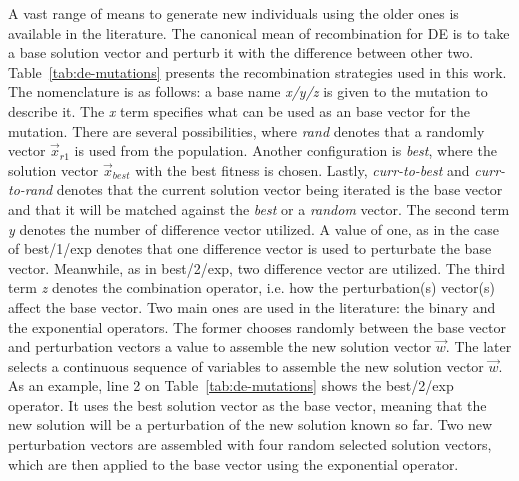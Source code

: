 A vast range of means to generate new individuals using the older ones is
available in the literature. The canonical mean of recombination for \ac{DE}
is to take a base solution vector and perturb it with the difference between
other two.
Table~\ref{tab:de-mutations} presents the recombination strategies used in this work.
The nomenclature is as follows: a base name \textit{x/y/z} is given to the
mutation to describe it. The \textit{x} term specifies what can be used
as an base vector for the mutation. There are several possibilities, where
\textit{rand} denotes that a randomly vector $\Vec{x}_{r1}$ is used from the population.
Another configuration is \textit{best}, where the solution vector $\Vec{x}_{best}$ 
with the best fitness is chosen. Lastly, \textit{curr-to-best} and \textit{curr-to-rand}
denotes that the current solution vector being iterated is the base vector and that
it will be matched against the \textit{best} or a \textit{random} vector.
The second term \textit{y} denotes the number of difference vector utilized.
A value of one, as in the case of best/1/exp denotes that one difference vector is
used to perturbate the base vector. Meanwhile, as in best/2/exp, two difference
vector are utilized. The third term \textit{z} denotes the combination operator,
i.e. how the perturbation(s) vector(s) affect the base vector. Two main ones
are used in the literature: the binary and the exponential operators.
The former chooses randomly between the base vector and perturbation vectors
a value to assemble the new solution vector $\Vec{w}$. The later selects
a continuous sequence of variables to assemble the new solution vector $\Vec{w}$.
As an example, line 2 on Table~\ref{tab:de-mutations} shows the best/2/exp operator.
It uses the best solution vector as the base vector, meaning that the new solution
will be a perturbation of the new solution known so far. Two new perturbation vectors
are assembled with four random selected solution vectors, which are then applied to
the base vector using the exponential operator.

